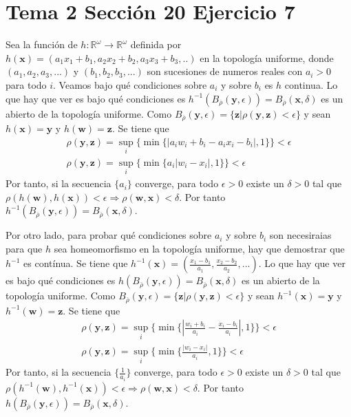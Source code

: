 \documentclass{article}
\newcommand{\vect}[1]{\boldsymbol{#1}}
\begin{document}
\section{Tema 2 Sección 20 Ejercicio 7}
Sea la función de $h:\mathbb{R}^{\omega}\rightarrow \mathbb{R}^{\omega}$ definida por  $h(\vect{x})=(a_1x_1 +b_1,a_2x_2 +b_2,a_3x_3 +b_3,..)$ en la topología uniforme, donde $(a_1,a_2,a_3,...)$ y  $(b_1,b_2,b_3,...)$ son sucesiones de numeros reales con $a_i>0$ para todo $i$. Veamos bajo qué condiciones sobre $a_i$ y sobre $b_i$ es $h$ continua. Lo que hay que ver es bajo qué condiciones es $h^{-1}(B_{\overline{\rho}}(\vect{y},\epsilon))=B_{\overline{\rho}}(\vect{x},\delta)$ es un abierto de la topología uniforme. 
Como $B_{\overline{\rho}}(\vect{y},\epsilon)=\{\vect{z}|\rho(\vect{y},\vect{z})<\epsilon\}$ y sean  $h(\vect{x})=\vect{y}$ y $h(\vect{w})=\vect{z}$. Se tiene que 
\begin{eqnarray}
\rho(\vect{y},\vect{z})=\sup_i\{\min\{|a_iw_i+b_i-a_ix_i-b_i|,1\}\}<\epsilon\nonumber\\
\rho(\vect{y},\vect{z})=\sup_i\{\min\{a_i|w_i-x_i|,1\}\}<\epsilon\nonumber
\end{eqnarray}
Por tanto, si la secuencia $\{a_i\}$ converge, para todo $\epsilon>0$ existe un $\delta>0$ tal que $\rho(h(\vect{w}),h(\vect{x}))<\epsilon\Rightarrow \rho(\vect{w},\vect{x})<\delta$. Por tanto  $h^{-1}(B_{\overline{\rho}}(\vect{y}, \epsilon))=B_{\overline{\rho}}(\vect{x}, \delta)$.

Por otro lado, para probar qué condiciones sobre $a_i$ y sobre $b_i$ son necesiraias para que $h$ sea homeomorfismo en la topología uniforme, hay que demostrar que $h^{-1}$ es contínua. Se tiene que $h^{-1}(\vect{x})=(\frac{x_1-b_1}{a_1},\frac{x_2-b_2}{a_2},...)$.  Lo que hay que ver es bajo qué condiciones es $h(B_{\overline{\rho}}(\vect{y},\epsilon))=B_{\overline{\rho}}(\vect{x},\delta)$ es un abierto de la topología uniforme. 
Como $B_{\overline{\rho}}(\vect{y},\epsilon)=\{\vect{z}|\rho(\vect{y},\vect{z})<\epsilon\}$ y sean  $h^{-1}(\vect{x})=\vect{y}$ y $h^{-1}(\vect{w})=\vect{z}$. Se tiene que 
\begin{eqnarray}
\rho(\vect{y},\vect{z})=\sup_i\{\min\{ |\frac{w_i+b_i}{a_i}-\frac{x_i-b_i}{a_i}|,1\}\}<\epsilon\nonumber\\
\rho(\vect{y},\vect{z})=\sup_i\{\min\{\frac{|w_i-x_i|}{a_i},1\}\}<\epsilon\nonumber
\end{eqnarray}
Por tanto, si la secuencia $\{\frac{1}{a_i}\}$ converge, para todo $\epsilon>0$ existe un $\delta>0$ tal que $\rho(h^{-1}(\vect{w}),h^{-1}(\vect{x}))<\epsilon\Rightarrow \rho(\vect{w},\vect{x})<\delta$. Por tanto  $h(B_{\overline{\rho}}(\vect{y}, \epsilon))=B_{\overline{\rho}}(\vect{x}, \delta)$.
 
\end{document}
